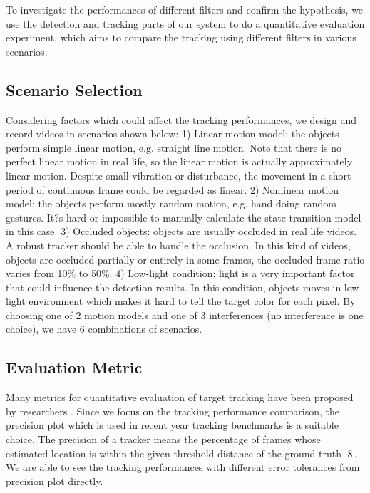\documentclass[10pt,twocolumn,letterpaper]{article}
\begin{document}
To investigate the performances of different filters and confirm the hypothesis, we use the detection and tracking parts of our system to do a quantitative evaluation experiment, which aims to compare the tracking using different filters in various scenarios.

\subsection{Scenario Selection}

Considering factors which could affect the tracking performances, we design and record videos in scenarios shown below:
1) Linear motion model: the objects perform simple linear motion, e.g. straight line motion. Note that there is no perfect linear motion in real life, so the linear motion is actually approximately linear motion. Despite small vibration or disturbance, the movement in a short period of continuous frame could be regarded as linear.
2) Nonlinear motion model: the objects perform mostly random motion, e.g. hand doing random gestures. It?s hard or impossible to manually calculate the state transition model in this case.
3) Occluded objects: objects are usually occluded in real life videos. A robust tracker should be able to handle the occlusion. In this kind of videos, objects are occluded partially or entirely in some frames, the occluded frame ratio varies from 10\% to 50\%.
4) Low-light condition: light is a very important factor that could influence the detection results. In this condition, objects moves in low-light environment which makes it hard to tell the target color for each pixel.
By choosing one of 2 motion models and one of 3 interferences (no interference is one choice), we have 6 combinations of scenarios.

\subsection{Evaluation Metric}

Many metrics for quantitative evaluation of target tracking have been proposed by researchers \cite{ref:bernardin2008evaluating}\cite{ref:li2009learning}\cite{ref:babenko2011robust}. Since we focus on the tracking performance comparison, the precision plot which is used in recent year tracking benchmarks \cite{ref:wu2013online}\cite{ref:wu2015object} is a suitable choice. The precision of a tracker means the percentage of frames whose estimated location is within the given threshold distance of the ground truth [8]. We are able to see the tracking performances with different error tolerances from precision plot directly.
\end{document}
